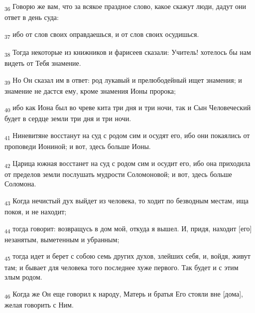 \begin{tcolorbox}
\textsubscript{36} Говорю же вам, что за всякое праздное слово, какое скажут люди, дадут они ответ в день суда:
\end{tcolorbox}
\begin{tcolorbox}
\textsubscript{37} ибо от слов своих оправдаешься, и от слов своих осудишься.
\end{tcolorbox}
\begin{tcolorbox}
\textsubscript{38} Тогда некоторые из книжников и фарисеев сказали: Учитель! хотелось бы нам видеть от Тебя знамение.
\end{tcolorbox}
\begin{tcolorbox}
\textsubscript{39} Но Он сказал им в ответ: род лукавый и прелюбодейный ищет знамения; и знамение не дастся ему, кроме знамения Ионы пророка;
\end{tcolorbox}
\begin{tcolorbox}
\textsubscript{40} ибо как Иона был во чреве кита три дня и три ночи, так и Сын Человеческий будет в сердце земли три дня и три ночи.
\end{tcolorbox}
\begin{tcolorbox}
\textsubscript{41} Ниневитяне восстанут на суд с родом сим и осудят его, ибо они покаялись от проповеди Иониной; и вот, здесь больше Ионы.
\end{tcolorbox}
\begin{tcolorbox}
\textsubscript{42} Царица южная восстанет на суд с родом сим и осудит его, ибо она приходила от пределов земли послушать мудрости Соломоновой; и вот, здесь больше Соломона.
\end{tcolorbox}
\begin{tcolorbox}
\textsubscript{43} Когда нечистый дух выйдет из человека, то ходит по безводным местам, ища покоя, и не находит;
\end{tcolorbox}
\begin{tcolorbox}
\textsubscript{44} тогда говорит: возвращусь в дом мой, откуда я вышел. И, придя, находит [его] незанятым, выметенным и убранным;
\end{tcolorbox}
\begin{tcolorbox}
\textsubscript{45} тогда идет и берет с собою семь других духов, злейших себя, и, войдя, живут там; и бывает для человека того последнее хуже первого. Так будет и с этим злым родом.
\end{tcolorbox}
\begin{tcolorbox}
\textsubscript{46} Когда же Он еще говорил к народу, Матерь и братья Его стояли вне [дома], желая говорить с Ним.
\end{tcolorbox}
